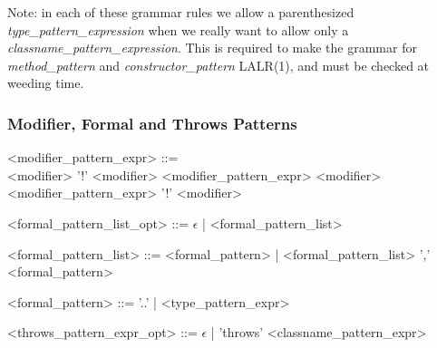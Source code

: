 \noindent
Note: in each of these grammar rules we allow a parenthesized
{\em type\_pattern\_expression} when we really want to allow
only a {\em classname\_pattern\_expression}.   This is required 
to make the grammar for {\em method\_pattern} and {\em constructor_pattern}
LALR(1),  and must be checked at weeding time. 

\subsubsection{Modifier, Formal and Throws Patterns}

\begin{minipage}{6in}
\begin{blue}
\begin{grammar}
<modifier_pattern_expr> ::= \hspace{1in} \\
     {\red <modifier>}
\alt '!' {\red <modifier>}
\alt <modifier_pattern_expr> {\red <modifier>}
\alt <modifier_pattern_expr> '!' {\red <modifier>}

<formal_pattern_list_opt> ::= $\epsilon$ | <formal_pattern_list>

<formal_pattern_list> ::= <formal_pattern> | <formal_pattern_list> ',' <formal_pattern>

<formal_pattern> ::= '..' | <type_pattern_expr>

<throws_pattern_expr_opt> ::= $\epsilon$ | 'throws' <classname_pattern_expr>
\end{grammar} 
\end{blue}
\end{minipage}
